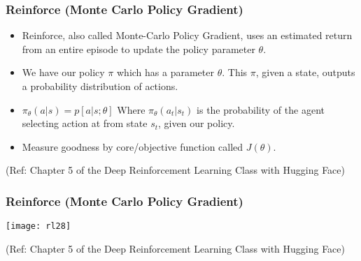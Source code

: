 \begin{frame}[fragile]\frametitle{Reinforce (Monte Carlo Policy Gradient)}

\begin{itemize}
\item Reinforce, also called Monte-Carlo Policy Gradient, uses an estimated return from an entire episode to update the policy parameter $\theta$.
\item We have our policy  $\pi$ which has a parameter $\theta$. This $\pi$, given a state, outputs a probability distribution of actions.
\item $\pi_\theta(a|s) = p[a|s;\theta]$ Where $\pi_\theta(a_t|s_t)$ is the probability of the agent selecting action at from state $s_t$, given our policy.
\item Measure goodness by core/objective function called $J(\theta)$.
\end{itemize}


{\tiny (Ref: Chapter 5 of the Deep Reinforcement Learning Class with Hugging Face)}

\end{frame}

\begin{frame}[fragile]\frametitle{Reinforce (Monte Carlo Policy Gradient)}

\begin{center}
\texttt{[image: rl28]}
\end{center}

{\tiny (Ref: Chapter 5 of the Deep Reinforcement Learning Class with Hugging Face)}

\end{frame}


